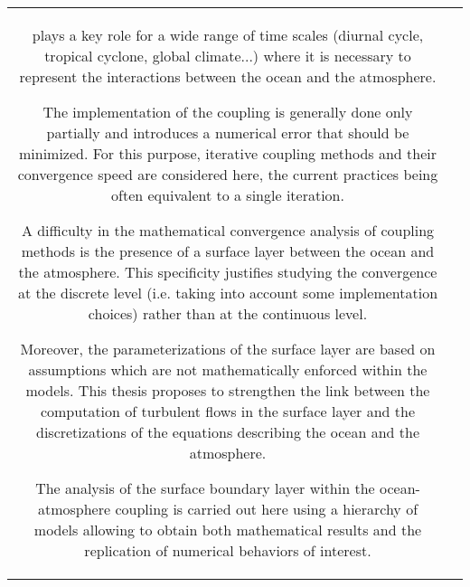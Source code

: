 \begin{tabular}{c|c}
{\begin{minipage}{18em}
plays a key role for a wide range of time scales
(diurnal cycle, tropical cyclone, global climate...)
where it is necessary to represent the interactions between the ocean and
the atmosphere.
\par
	\vspace{0.2cm}
The implementation of the coupling is generally done only partially
and introduces a numerical error that should be minimized.
For this purpose, iterative coupling methods and their convergence speed
are considered here, the current practices being often equivalent to a
single iteration.
\par
	\vspace{0.2cm}
A difficulty in the mathematical convergence analysis
of coupling methods is the presence of a surface layer
between the ocean and the atmosphere.
This specificity justifies studying the convergence at the
discrete level (i.e. taking into account some implementation choices) rather than
at the continuous level.
\par
	\vspace{0.2cm}
Moreover, the parameterizations of the surface layer
are based on assumptions which are not mathematically
enforced within the models.
This thesis proposes to strengthen the link between
the computation of turbulent flows in the surface layer
and the discretizations of the equations describing the ocean
and the atmosphere.
\par
	\vspace{0.2cm}
The analysis of the surface boundary layer within the ocean-atmosphere coupling
is carried out here using a hierarchy
of models allowing to obtain both mathematical results and the
replication of numerical behaviors of interest.
\end{minipage}}
\end{tabular}
